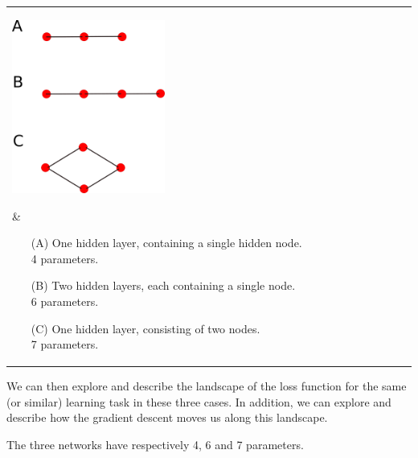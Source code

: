 \documentclass[12pt,a4paper]{article}
\begin{document}
\begin{center}
\begin{tabular}{l|l}
\hline
%
\parbox{0.42\textwidth}{ 
%

\begin{center}\includegraphics[width=0.4\textwidth]{Images/3_architectures_a_01}
\end{center}


} &   \hspace{-0.01\textwidth}
\parbox{0.48\textwidth}{ \flushleft

\begin{itemize}

\item[(A)] One hidden layer, containing a single hidden node. \\ 4 parameters. 

\bigskip 

\item[(B)] Two hidden layers, each containing a single node. 
  \\ 6 parameters.
  
\bigskip 

\item[(C)] One hidden layer, consisting of two nodes. 
  \\ 7 parameters.
  
\end{itemize}

} 
\\
\hline
\end{tabular}
\end{center}



We can then explore and describe the landscape of the loss function for the same (or similar)
learning task in these three cases.  In addition, we can explore and describe how the gradient descent moves us along
this landscape.

The three networks have respectively 4, 6 and 7 parameters.
\end{document}

